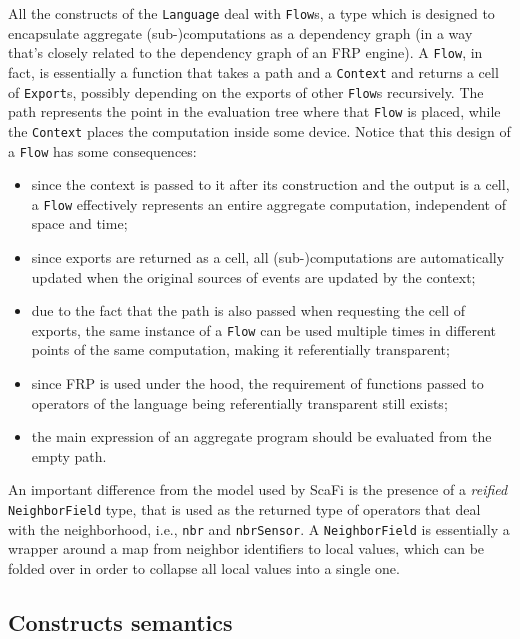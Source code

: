 All the constructs of the \texttt{Language} deal with \texttt{Flow}s, a type which is designed to encapsulate aggregate (sub-)computations as a dependency graph (in a way that's closely related to the dependency graph of an FRP engine).
%
A \texttt{Flow}, in fact, is essentially a function that takes a path and a \texttt{Context} and returns a cell of \texttt{Export}s, possibly depending on the exports of other \texttt{Flow}s recursively.
%
The path represents the point in the evaluation tree where that \texttt{Flow} is placed, while the \texttt{Context} places the computation inside some device.
%
Notice that this design of a \texttt{Flow} has some consequences:
%
\begin{itemize}
    \item since the context is passed to it after its construction and the output is a cell, a \texttt{Flow} effectively represents an entire aggregate computation, independent of space and time;
    \item since exports are returned as a cell, all (sub-)computations are automatically updated when the original sources of events are updated by the context;
    \item due to the fact that the path is also passed when requesting the cell of exports, the same instance of a \texttt{Flow} can be used multiple times in different points of the same computation, making it referentially transparent;
    \item since FRP is used under the hood, the requirement of functions passed to operators of the language being referentially transparent still exists;
    \item the main expression of an aggregate program should be evaluated from the empty path.
\end{itemize}

An important difference from the model used by ScaFi is the presence of a \textit{reified} \texttt{NeighborField} type, that is used as the returned type of operators that deal with the neighborhood, i.e., \texttt{nbr} and \texttt{nbrSensor}.
%
A \texttt{NeighborField} is essentially a wrapper around a map from neighbor identifiers to local values, which can be folded over in order to collapse all local values into a single one.

\subsection{Constructs semantics}
\label{sec:constructs-semantics}

